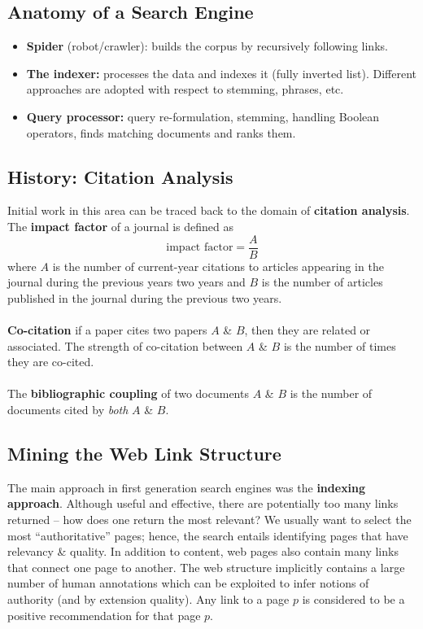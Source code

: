 \documentclass[a4paper,11pt]{article}
\begin{document}
\subsection{Anatomy of a Search Engine}
\begin{itemize}
    \item   \textbf{Spider} (robot/crawler): builds the corpus by recursively following links.
    \item   \textbf{The indexer:} processes the data and indexes it (fully inverted list).
            Different approaches are adopted with respect to stemming, phrases, etc.
    \item   \textbf{Query processor:} query re-formulation, stemming, handling Boolean operators, finds matching documents and ranks them.
\end{itemize}

\subsection{History: Citation Analysis}
Initial work in this area can be traced back to the domain of \textbf{citation analysis}.
The \textbf{impact factor} of a journal is defined as 
\[
    \text{impact factor} = \frac{A}{B}
\]
where $A$ is the number of current-year citations to articles appearing in the journal during the previous years two years and $B$ is the number of articles published in the journal during the previous two years.
\\\\
\textbf{Co-citation} if a paper cites two papers $A$ \& $B$, then they are related or associated.
The strength of co-citation between $A$ \& $B$ is the number of times they are co-cited.
\\\\
The \textbf{bibliographic coupling} of two documents $A$ \& $B$ is the number of documents cited by \textit{both} $A$ \& $B$.

\subsection{Mining the Web Link Structure}
The main approach in first generation search engines was the \textbf{indexing approach}.
Although useful and effective, there are potentially too many links returned -- how does one return the most relevant?
We usually want to select the most ``authoritative'' pages; hence, the search entails identifying pages that have relevancy \& quality.
In addition to content, web pages also contain many links that connect one page to another.
The web structure implicitly contains a large number of human annotations which can be exploited to infer notions of authority (and by extension quality).
Any link to a page $p$ is considered to be a positive recommendation for that page $p$.
\end{document}
